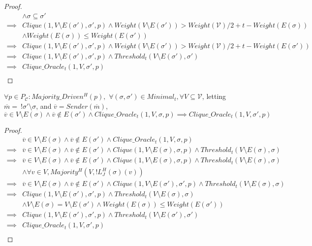 \begin{proof}
\begin{align}
          &\land \sigma \subseteq \sigma' \\
  \implies&Clique(1, V \setminus E(\sigma'), \sigma', p) \land Weight(V \setminus E(\sigma')) > Weight(\mathcal{V})/2 + t - Weight(E(\sigma)) \\
          &\land Weight(E(\sigma)) \leq Weight(E(\sigma')) \\
  \implies&Clique(1, V \setminus E(\sigma'), \sigma', p) \land Weight(V \setminus E(\sigma')) > Weight(\mathcal{V})/2 + t - Weight(E(\sigma')) \\
  \implies&Clique(1, V \setminus E(\sigma'), \sigma', p) \land Threshold_t(V \setminus E(\sigma'), \sigma') \\
  \implies&Clique\_Oracle_t(1, V, \sigma', p) \\
\end{align}
\end{proof}

\begin{lemma}
  $\forall p \in P_{\mathcal{C}} : Majority\_Driven^H(p),$ $\forall (\sigma, \sigma') \in Minimal_t, \forall V \subseteq \mathcal{V}$, letting $\overline{m} = ~ !\sigma'\setminus\sigma$, and $\overline{v} = Sender(\overline{m})$,
  $$
  \overline{v} \in V \setminus E(\sigma) \land \overline{v} \notin E(\sigma') \land Clique\_Oracle_t(1, V, \sigma, p) \implies Clique\_Oracle_t(1, V, \sigma', p)
  $$
\end{lemma}

\begin{proof}
\begin{align}
          &\overline{v} \in V \setminus E(\sigma) \land \overline{v} \notin E(\sigma') \land Clique\_Oracle_t(1, V, \sigma, p) \\
  \implies&\overline{v} \in V \setminus E(\sigma) \land \overline{v} \notin E(\sigma') \land Clique(1, V \setminus E(\sigma), \sigma, p) \land Threshold_t(V \setminus E(\sigma), \sigma) \\
  \implies&\overline{v} \in V \setminus E(\sigma) \land \overline{v} \notin E(\sigma') \land Clique(1, V \setminus E(\sigma), \sigma, p) \land Threshold_t(V \setminus E(\sigma), \sigma) \\
          &\land \forall v \in V, Majority^H(V, !L^H_J(\sigma)(v)) \\
  \implies&\overline{v} \in V \setminus E(\sigma) \land \overline{v} \notin E(\sigma') \land Clique(1, V \setminus E(\sigma'), \sigma', p) \land Threshold_t(V \setminus E(\sigma), \sigma) \\
  \implies&Clique(1, V \setminus E(\sigma'), \sigma', p) \land Threshold_t(V \setminus E(\sigma), \sigma) \\
          &\land V \setminus E(\sigma) = V \setminus E(\sigma') \land Weight(E(\sigma)) \leq Weight(E(\sigma')) \\
  \implies&Clique(1, V \setminus E(\sigma'), \sigma', p) \land Threshold_t(V \setminus E(\sigma'), \sigma') \\
  \implies&Clique\_Oracle_t(1, V, \sigma', p) \\
\end{align}
\end{proof}


